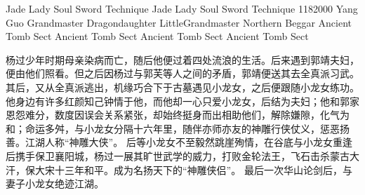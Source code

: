 \documentclass[print, doctor, vlined]{DissertUESTC}
\begin{document}
	\uestczhtitlepage  %
	

	\uestcentitlepage{}{}{}{}{}{}{}  %
					{Jade Lady Soul Sword Technique Jade Lady Soul Sword Technique}
					{1182000}
					{Yang Guo}
					{Grandmaster Dragondaughter Little}{Grandmaster Northern Beggar}
					{Ancient Tomb Sect Ancient Tomb Sect Ancient Tomb Sect Ancient Tomb Sect}
	
	\declaration{}{}{}  %
	

	
	
	\zhabstract
	
	杨过少年时期母亲染病而亡，随后他便过着四处流浪的生活。后来遇到郭靖夫妇，便由他们照看。但之后因杨过与郭芙等人之间的矛盾，郭靖便送其去全真派习武。其后，又从全真派逃出，机缘巧合下于古墓遇见小龙女，之后便跟随小龙女练功。 他身边有许多红颜知己钟情于他，而他却一心只爱小龙女，后结为夫妇；他和郭家恩怨难分，数度因误会关系紧张，却始终挺身而出相助他们，解除嫌隙，化气为和；命运多舛，与小龙女分隔十六年里，随伴亦师亦友的神雕行侠仗义，惩恶扬善。江湖人称“神雕大侠”。 后等小龙女不至毅然跳崖殉情，在谷底与小龙女重逢后携手保卫襄阳城，杨过一展其旷世武学的威力，打败金轮法王，飞石击杀蒙古大汗，保大宋十三年和平。成为名扬天下的“神雕侠侣”。 最后一次华山论剑后，与妻子小龙女绝迹江湖。
	
	
	
	\enabstract
	
\end{document}
